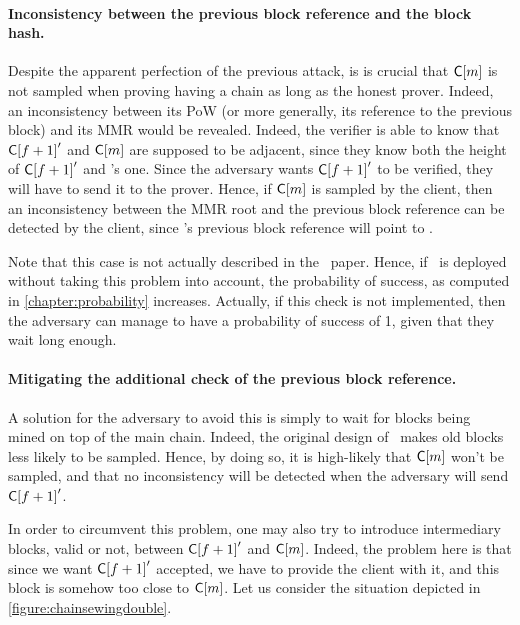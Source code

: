       \paragraph{Inconsistency between the previous block reference and the block hash.} Despite the apparent perfection of the previous attack, is is crucial that \(\mathsf{C[}m\mathsf{]}\) is not sampled when proving having a chain as long as the honest prover. Indeed, an inconsistency between its PoW (or more generally, its reference to the previous block) and its MMR would be revealed. Indeed, the verifier is able to know that \(\mathsf{C[}f+1\mathsf{]}'\) and \(\mathsf{C[}m\mathsf{]}\) are supposed to be adjacent, since they know both the height of \(\mathsf{C[}f+1\mathsf{]}'\) and 's one. Since the adversary wants \(\mathsf{C[}f+1\mathsf{]}'\) to be verified, they will have to send it to the prover. Hence, if \(\mathsf{C[}m\mathsf{]}\) is sampled by the client, then an inconsistency between the MMR root and the previous block reference can be detected by the client, since 's previous block reference will point to .
      
      Note that this case is not actually described in the \FC\ paper. Hence, if \FC\ is deployed without taking this problem into account, the probability of success, as computed in \autoref{chapter:probability} increases. Actually, if this check is not implemented, then the adversary can manage to have a probability of success of 1, given that they wait long enough.
      
      \paragraph{Mitigating the additional check of the previous block reference.} A solution for the adversary to avoid this is simply to wait for blocks being mined on top of the main chain. Indeed, the original design of \FC\ makes old blocks less likely to be sampled. Hence, by doing so, it is high-likely that \(\mathsf{C[}m\mathsf{]}\) won't be sampled, and that no inconsistency will be detected when the adversary will send \(\mathsf{C[}f+1\mathsf{]}'\).
      
      In order to circumvent this problem, one may also try to introduce intermediary blocks, valid or not, between \(\mathsf{C[}f+1\mathsf{]}'\) and \(\mathsf{C[}m\mathsf{]}\). Indeed, the problem here is that since we want \(\mathsf{C[}f+1\mathsf{]}'\) accepted, we have to provide the client with it, and this block is somehow too close to \(\mathsf{C[}m\mathsf{]}\). Let us consider the situation depicted in \autoref{figure:chainsewingdouble}.
      
